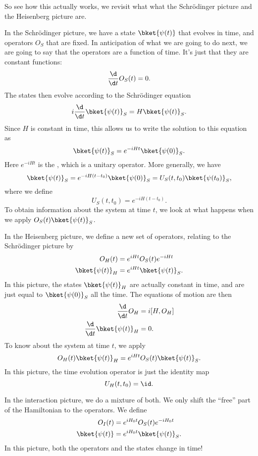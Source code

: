 \documentclass[a4paper]{article}
\begin{document}
So see how this actually works, we revisit what what the Schr\"odinger picture and the Heisenberg picture are.

\separator

In the Schr\"odinger picture, we have a state $\bket{\psi(t)}$ that evolves in time, and operators $O_S$ that are fixed. In anticipation of what we are going to do next, we are going to say that the operators are a function of time. It's just that they are constant functions:
\[
  \frac{\d}{\d t}O_S(t) = 0.
\]
The states then evolve according to the Schr\"odinger equation
\[
  i \frac{\d}{\d t} \bket{\psi(t)}_S = H \bket{\psi(t)}_S.
\]
Since $H$ is constant in time, this allows us to write the solution to this equation as
\[
  \bket{\psi(t)}_S = e^{-iHt} \bket{\psi(0)}_S.
\]
Here $e^{-iHt}$ is the , which is a unitary operator. More generally, we have
\[
  \bket{\psi(t)}_S = e^{-iH(t - t_0)} \bket{\psi(0)}_S = U_S(t, t_0) \bket{\psi(t_0)}_S,
\]
where we define
\[
  U_S(t, t_0) = e^{-iH(t - t_0)}.
\]
To obtain information about the system at time $t$, we look at what happens when we apply $O_S(t) \bket{\psi(t)}_S$.

\separator

In the Heisenberg picture, we define a new set of operators, relating to the Schr\"odinger picture by
\begin{align*}
  O_H(t) &= e^{iHt} O_S(t) e^{-iHt}\\
  \bket{\psi(t)}_H &= e^{iHt}\bket{\psi(t)}_S.
\end{align*}
In this picture, the states $\bket{\psi(t)}_H$ are actually constant in time, and are just equal to $\bket{\psi(0)}_S$ all the time. The equations of motion are then
\begin{align*}
  \frac{\d}{\d t}O_H &= i [H, O_H]\\
  \frac{\d}{\d t}\bket{\psi(t)}_H &= 0.
\end{align*}
To know about the system at time $t$, we apply
\[
  O_H(t) \bket{\psi(t)}_H = e^{iHt}O_S(t) \bket{\psi(t)}_S.
\]
In this picture, the time evolution operator is just the identity map
\[
  U_H(t, t_0) = \id.
\]
\separator

In the interaction picture, we do a mixture of both. We only shift the ``free'' part of the Hamiltonian to the operators. We define
\begin{align*}
  O_I(t) &= e^{iH_0 t}O_S(t) e^{-iH_0 t}\\
  \bket{\psi(t)} &= e^{iH_0 t}\bket{\psi(t)}_S.
\end{align*}
In this picture, both the operators and the states change in time!
\end{document}
